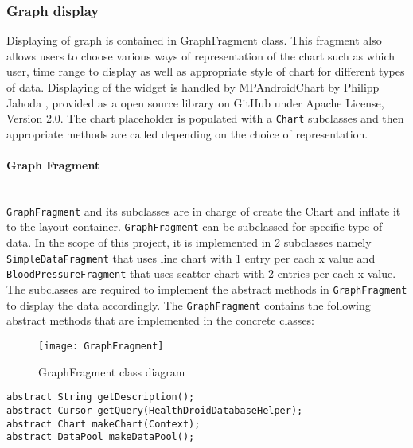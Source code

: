 \subsubsection{Graph display}
Displaying of graph is contained in GraphFragment class. This fragment also allows users to choose various ways of
representation of the chart such as which user, time range to display as well as appropriate style of chart for
different types of data. Displaying of the widget is handled by MPAndroidChart by Philipp Jahoda \cite{MPAndroidChart},
provided as a open source library on GitHub under Apache License, Version 2.0. The chart placeholder is populated with a
\texttt{Chart} subclasses and then appropriate methods are called depending on the choice of representation.

\paragraph{Graph Fragment}\mbox{} \\
\texttt{GraphFragment} and its subclasses are in charge of create the Chart and inflate it to the layout container.
\texttt{GraphFragment} can be subclassed for specific type of data. In the scope of this project, it is implemented in 2
subclasses namely \texttt{SimpleDataFragment} that uses line chart with 1 entry per each x value and
\texttt{BloodPressureFragment} that uses scatter chart with 2 entries per each x value. The subclasses are required to
implement the abstract methods in \texttt{GraphFragment} to display the data accordingly.  The \texttt{GraphFragment}
contains the following abstract methods that are implemented in the concrete classes:

\begin{figure}[!ht]
    \caption{GraphFragment class diagram}
    \centering
    \texttt{[image: GraphFragment]}
\end{figure}

\begin{lstlisting}
abstract String getDescription();
abstract Cursor getQuery(HealthDroidDatabaseHelper);
abstract Chart makeChart(Context);
abstract DataPool makeDataPool();
\end{lstlisting}

